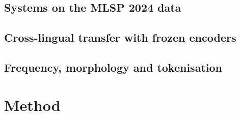 \subsection*{Systems on the MLSP 2024 data}

\subsection*{Cross-lingual transfer with frozen encoders}

\subsection*{Frequency, morphology and tokenisation}

\section{Method}
\label{sec:method}

